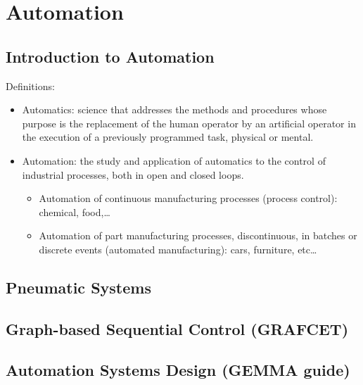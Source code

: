 \chapter{Automation}
\section{Introduction to Automation}
Definitions:
\begin{itemize}
    \item Automatics: science that addresses the methods and procedures whose purpose is the replacement of the human operator by an artificial operator in the execution of a previously programmed task, physical or mental.
    \item Automation: the study and application of automatics to the control of industrial processes, both in open and closed loops.
    \begin{itemize}
        \item Automation of continuous manufacturing processes (process control): chemical, food,\dots
        \item Automation of part manufacturing processes, discontinuous, in batches or discrete events (automated manufacturing): cars, furniture, etc\dots
    \end{itemize}
\end{itemize}

\section{Pneumatic Systems}

\section{Graph-based Sequential Control (GRAFCET)}

\section{Automation Systems Design (GEMMA guide)}
